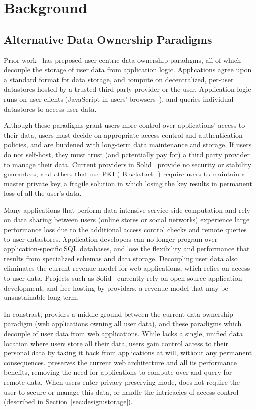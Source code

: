\section{Background}

\subsection{Alternative Data Ownership Paradigms}
Prior work~\cite{solid, amber, w5, blockstack, bstore} has proposed user-centric data ownership
paradigms, all of which decouple the storage of user data from application logic. Applications agree
upon a standard format for data storage, and compute on decentralized, per-user datastores hosted by
a trusted third-party provider or the user.  Application logic runs on user clients (\eg JavaScript
in users' browsers~\cite{solid, blockstack, bstore}), and queries individual datastores to access
user data.%

Although these paradigms grant users more control over applications' access to their data, users
must decide on appropriate access control and authentication policies, and are burdened with
long-term data maintenance and storage. If users do not self-host, they must trust (and potentially
pay for) a third party provider to manage their data. Current providers in Solid~\cite{solid}
provide no security or stability guarantees, and others that use PKI (\eg
Blockstack~\cite{blockstack}) require users to maintain a master private key, a fragile solution in
which losing the key results in permanent loss of all the user's data.

Many applications that perform data-intensive service-side computation and rely on data sharing
between users (\eg online stores or social networks) experience large performance loss due to the
additional access control checks and remote queries to user datastores. Application
developers can no longer program over application-specific SQL databases, and lose the flexibility and performance that results from specialized schemas and data storage.
Decoupling user data also eliminates the current revenue model for web applications, which relies on access
to user data. Projects such as Solid~\cite{solid} currently rely on open-source application
development, and free hosting by providers, a revenue model that may be unsustainable
long-term.

In constrast, \name provides a middle ground between the current data ownership paradigm (web
applications owning all user data), and these paradigms which decouple of user data from web applications. 
While \name lacks a single, unified data location where users store all their data,
users gain control access to their personal data by taking it back from applications at will, without
any permanent consequences.  \name preserves the current web architecture and all
its performance benefits, removing the need for applications to compute over and query for remote
data.  When users enter privacy-preserving mode, \name does not require the user
to secure or manage this data, or handle the intricacies of access control (described in
Section~\ref{sec:design:storage}).

